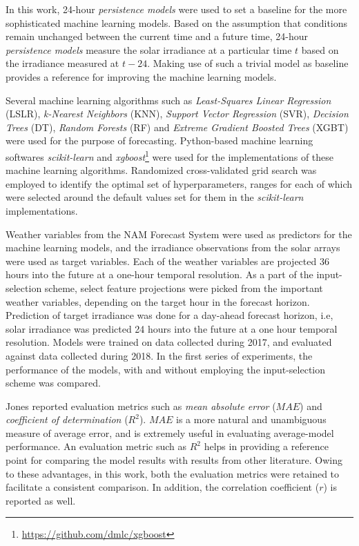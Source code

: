 \par In this work, 24-hour \textit{persistence models} were used to set a baseline for the more sophisticated machine learning models. Based on the assumption that conditions remain unchanged between the current time and a future time, 24-hour \textit{persistence models} measure the solar irradiance at a particular time $t$ based on the irradiance measured at $t-24$. Making use of such a trivial model as baseline provides a reference for improving the machine learning models. 

\par Several machine learning algorithms such as \textit{Least-Squares Linear Regression} (LSLR), \textit{k-Nearest Neighbors} (KNN), \textit{Support Vector Regression} (SVR), \textit{Decision Trees} (DT), \textit{Random Forests} (RF) and \textit{Extreme Gradient Boosted Trees} (XGBT) were used for the purpose of forecasting. Python-based machine learning softwares \textit{scikit-learn} and \textit{xgboost}\footnote{\url{https://github.com/dmlc/xgboost}} were used for the implementations of these machine learning algorithms. Randomized cross-validated grid search was employed to identify the optimal set of hyperparameters, ranges for each of which were selected around the default values set for them in the \textit{scikit-learn} implementations.

\par Weather variables from the NAM Forecast System were used as predictors for the machine learning models, and the irradiance observations from the solar arrays were used as target variables. Each of the weather variables are projected 36 hours into the future at a one-hour temporal resolution. As a part of the input-selection scheme, select feature projections were picked from the important weather variables, depending on the target hour in the forecast horizon. Prediction of target irradiance was done for a day-ahead forecast horizon, i.e, solar irradiance was predicted 24 hours into the future at a one hour temporal resolution. Models were trained on data collected during 2017, and evaluated against data collected during 2018. In the first series of experiments, the performance of the models, with and without employing the input-selection scheme was compared.

\par Jones \cite{thesis_zach} reported evaluation metrics such as \textit{mean absolute error} ($MAE$) and \textit{coefficient of determination} ($R^2$). $MAE$ is a more natural and unambiguous measure of average error, and is extremely useful in evaluating average-model performance. An evaluation metric such as $R^2$ helps in providing a reference point for comparing the model results with results from other literature. Owing to these advantages, in this work, both the evaluation metrics were retained to facilitate a consistent comparison. In addition, the correlation coefficient ($r$) is reported as well.

